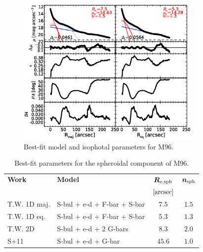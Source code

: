 \documentclass[preprint2]{emulateapj}
\newcommand{\fitfigurewidth}{0.8\textwidth}
\begin{document}
  \begin{figure}[h]
  \begin{center}
  \includegraphics[width=\fitfigurewidth]{images/m96_1Dfit.eps}
  \caption{Best-fit model and isophotal parameters for M96.}
  \end{center}
  \end{figure}

  \begin{table}[h]
  \small
  \caption{Best-fit parameters for the spheroidal component of M96.}
  \begin{center}
  \begin{tabular}{llcc}
  \hline
  {\bf Work} & {\bf Model}   & $\bm R_{\rm e,sph}$    & $\bm n_{\rm sph}$ \\
    &  &  $[\rm arcsec]$ & \\
  \hline
  T.W. 1D maj. & S-bul + e-d + F-bar + S-bar  & $7.5$  &  $1.5$ \\
  T.W. 1D eq.  & S-bul + e-d + F-bar + S-bar  & $5.3$  &  $1.3$ \\
  T.W. 2D      & S-bul + e-d + 2 G-bars       & $8.3$  &  $2.0$ \\
  \hline
  S+11         & S-bul + e-d + G-bar  & $45.6$  &  $1.0$ \\
  \hline
  \end{tabular}
  \end{center}
  \label{tab:m96}
  \end{table}


  \clearpage\newpage\noindent
\end{document}

